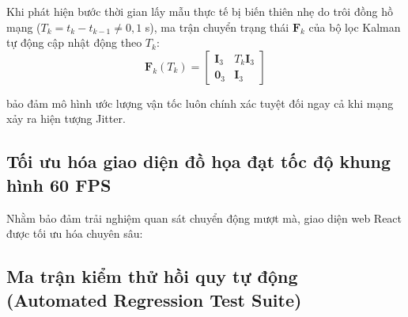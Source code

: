 Khi phát hiện bước thời gian lấy mẫu thực tế bị biến thiên nhẹ do trôi đồng hồ mạng ($T_k = t_k - t_{k-1} \neq 0{,}1$ s), ma trận chuyển trạng thái $\mathbf{F}_k$ của bộ lọc Kalman tự động cập nhật động theo $T_k$:
\begin{equation}
\mathbf{F}_k(T_k) = \begin{bmatrix}
\mathbf{I}_3 & T_k \mathbf{I}_3 \\
\mathbf{0}_3 & \mathbf{I}_3
\end{bmatrix}
\label{eq:dynamic-kalman-transition-matrix}
\end{equation}

bảo đảm mô hình ước lượng vận tốc luôn chính xác tuyệt đối ngay cả khi mạng xảy ra hiện tượng Jitter.

\subsection{Tối ưu hóa giao diện đồ họa đạt tốc độ khung hình 60 FPS}

\hspace{0.5cm} Nhằm bảo đảm trải nghiệm quan sát chuyển động mượt mà, giao diện web React được tối ưu hóa chuyên sâu:

\begin{table}[H]
\centering
\caption{Đo đạc hiệu năng giao diện người dùng trước và sau khi tối ưu hóa dựng hình}
\label{tab:frontend-performance-optimization}
\end{table}

\subsection{Ma trận kiểm thử hồi quy tự động (Automated Regression Test Suite)}

